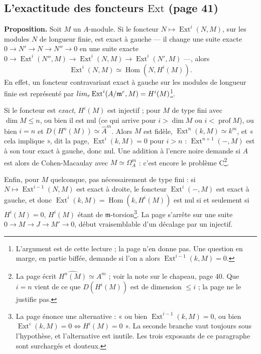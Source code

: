 \documentclass[11pt,a4paper]{article}
\begin{document}
\subsection*{L'exactitude des foncteurs $\mathrm{Ext}$ (page 41)}

\textbf{Proposition.} Soit $M$ un $A$-module. Si le foncteur $N \mapsto
\operatorname{Ext}^i(N, M)$, sur les modules $N$ de longueur finie, est exact
à gauche --- il change une suite exacte $0 \to N' \to N \to N'' \to 0$ en une
suite exacte $0 \to \operatorname{Ext}^i(N'', M) \to \operatorname{Ext}^i(N, M)
\to \operatorname{Ext}^i(N', M)$ ---, alors
\[
  \operatorname{Ext}^i(N, M) \simeq \operatorname{Hom}(N, H^i(M)).
\]
En effet, un foncteur contravariant exact à gauche sur les modules de longueur
finie est représenté par $\varinjlim_r \operatorname{Ext}^i(A/\mathfrak{m}^r, M)
= H^i(M)$\footnote{L'argument est de cette lecture ; la page n'en donne pas.
Une question en marge, en partie
biffée, demande si l'on a alors $\operatorname{Ext}^{i-1}(k, M) = 0$.}.

Si le foncteur est \emph{exact}, $H^i(M)$ est injectif ; pour $M$ de type fini
avec $\dim M \leqslant n$, ou bien il est nul (ce qui arrive pour $i > \dim M$
ou $i < \operatorname{prof} M$), ou bien $i = n$ et $D(H^n(M)) \simeq
\widehat{A}^m$. Alors $M$ est fidèle, $\operatorname{Ext}^n(k, M) \simeq k^m$,
et « cela implique », dit la page, $\operatorname{Ext}^i(k, M) = 0$ pour $i >
n$ : $\operatorname{Ext}^{n+1}(-, M)$ est à son tour exact à gauche, donc
nul. Une addition à l'encre noire
demande si $A$ est alors de Cohen-Macaulay avec $M \simeq \Omega_A^m$ : c'est
encore le problème C\footnote{La page écrit $\widehat{H^n(M)} \simeq A^m$ ;
voir la note sur le chapeau, page 40. Que $i = n$ vient de ce que
$D(H^i(M))$ est de dimension $\leqslant i$ ; la page ne le justifie pas.}.

Enfin, pour $M$ quelconque, pas nécessairement de type fini : si $N \mapsto
\operatorname{Ext}^{i-1}(N, M)$ est exact à droite, le foncteur
$\operatorname{Ext}^i(-, M)$ est exact à gauche, et donc
$\operatorname{Ext}^i(k, M) = \operatorname{Hom}(k, H^i(M))$ est nul si et
seulement si $H^i(M) = 0$, $H^i(M)$ étant de $\mathfrak{m}$-torsion\footnote{La
page énonce une alternative : « ou bien $\operatorname{Ext}^{i-1}(k, M) = 0$,
ou bien $\operatorname{Ext}^i(k, M) = 0 \Leftrightarrow H^i(M) = 0$ ». La
seconde branche vaut toujours sous l'hypothèse, et l'alternative est inutile.
Les trois exposants de ce paragraphe sont surchargés et douteux.}. La page
s'arrête sur une suite $0 \to M \to J \to M' \to 0$, début vraisemblable d'un
décalage par un injectif.
\end{document}
